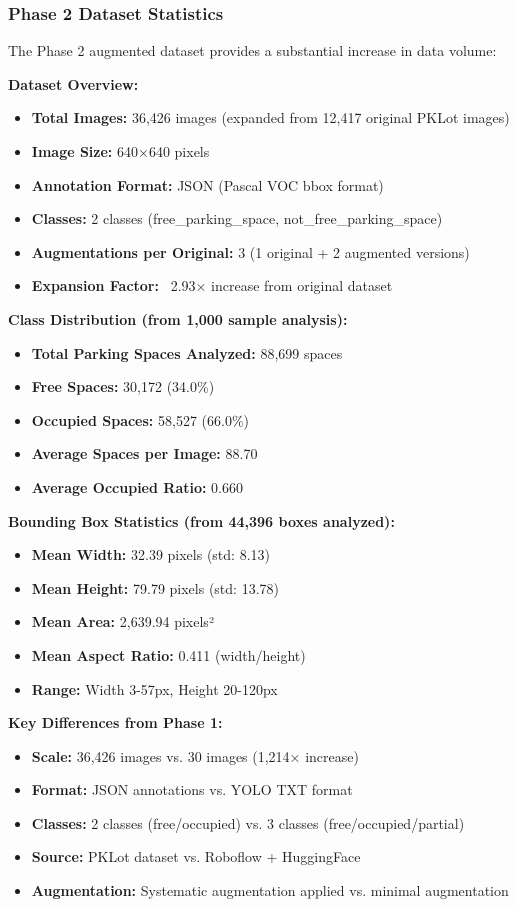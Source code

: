 \documentclass[12pt,a4paper]{article}
\begin{document}
\subsubsection{Phase 2 Dataset Statistics}

The Phase 2 augmented dataset provides a substantial increase in data volume:

\textbf{Dataset Overview:}
\begin{itemize}
    \item \textbf{Total Images:} 36,426 images (expanded from 12,417 original PKLot images)
    \item \textbf{Image Size:} 640×640 pixels
    \item \textbf{Annotation Format:} JSON (Pascal VOC bbox format)
    \item \textbf{Classes:} 2 classes (free\_parking\_space, not\_free\_parking\_space)
    \item \textbf{Augmentations per Original:} 3 (1 original + 2 augmented versions)
    \item \textbf{Expansion Factor:} ~2.93× increase from original dataset
\end{itemize}

\textbf{Class Distribution (from 1,000 sample analysis):}
\begin{itemize}
    \item \textbf{Total Parking Spaces Analyzed:} 88,699 spaces
    \item \textbf{Free Spaces:} 30,172 (34.0\%)
    \item \textbf{Occupied Spaces:} 58,527 (66.0\%)
    \item \textbf{Average Spaces per Image:} 88.70
    \item \textbf{Average Occupied Ratio:} 0.660
\end{itemize}

\textbf{Bounding Box Statistics (from 44,396 boxes analyzed):}
\begin{itemize}
    \item \textbf{Mean Width:} 32.39 pixels (std: 8.13)
    \item \textbf{Mean Height:} 79.79 pixels (std: 13.78)
    \item \textbf{Mean Area:} 2,639.94 pixels²
    \item \textbf{Mean Aspect Ratio:} 0.411 (width/height)
    \item \textbf{Range:} Width 3-57px, Height 20-120px
\end{itemize}

\textbf{Key Differences from Phase 1:}
\begin{itemize}
    \item \textbf{Scale:} 36,426 images vs. 30 images (1,214× increase)
    \item \textbf{Format:} JSON annotations vs. YOLO TXT format
    \item \textbf{Classes:} 2 classes (free/occupied) vs. 3 classes (free/occupied/partial)
    \item \textbf{Source:} PKLot dataset vs. Roboflow + HuggingFace
    \item \textbf{Augmentation:} Systematic augmentation applied vs. minimal augmentation
\end{itemize}
\end{document}
